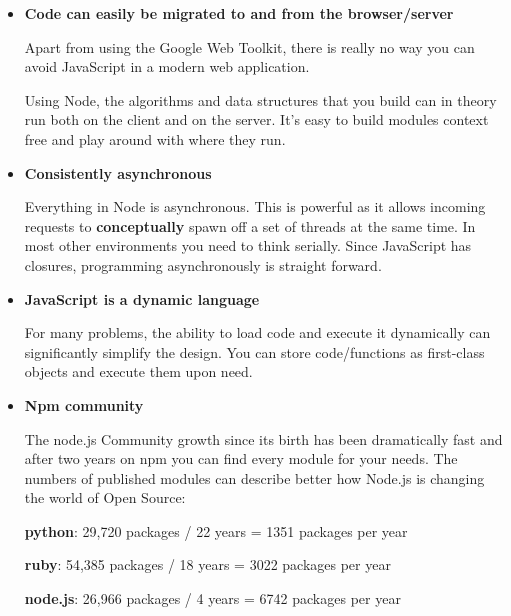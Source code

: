 \documentclass[a4paper,13pt]{report}
\begin{document}
        \begin{itemize}
            \item
            \textbf{Code can easily be migrated to and from the browser/server}\newline
            

            Apart from using the Google Web Toolkit, there is really no way you can avoid JavaScript in a modern web application. \newline

            Using Node, the algorithms and data structures that you build can in theory run both on the client and on the server. It's easy to build modules context free and play around with where they run. 

            \item
            \textbf{Consistently asynchronous}\newline
            

            Everything in Node is asynchronous. This is powerful as it allows incoming requests to \textbf{conceptually} spawn off a set of threads at the same time. In most other environments you need to think serially. Since JavaScript has closures, programming asynchronously is straight forward.

            \item
            \textbf{JavaScript is a dynamic language}\newline
            

            For many problems, the ability to load code and execute it dynamically can significantly simplify the design. You can store code/functions as first-class objects and execute them upon need.

            \item
                \textbf{Npm community}

                The node.js Community growth since its birth has been dramatically fast and after two years on npm you can find every module for your needs.
                The numbers of published modules can describe better how Node.js is changing the world of Open Source:

                \textbf{python}:  29,720 packages / 22 years = 1351 packages per year\newline

                \textbf{ruby}:      54,385 packages / 18 years =    3022 packages per year\newline

                \textbf{node.js}:  26,966 packages / 4 years =   6742 packages per year \newline


\end{itemize}
\end{document}
